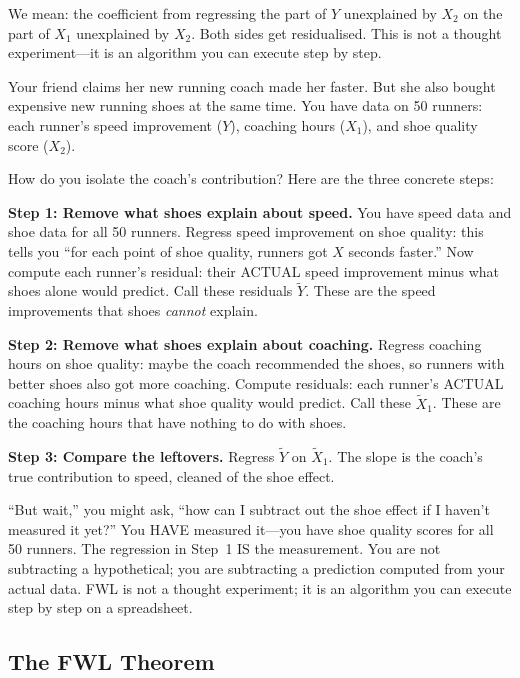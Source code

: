 \documentclass[11pt,a4paper]{article}
\theoremstyle{definition}
\theoremstyle{plain}
\theoremstyle{remark}
\begin{document}
We mean: the coefficient from regressing the part of $Y$ unexplained by $X_2$ on the part of $X_1$ unexplained by $X_2$. Both sides get residualised. This is not a thought experiment---it is an algorithm you can execute step by step.

\begin{toystory}[title={Is It the Coaching or Just the New Shoes?}]
Your friend claims her new running coach made her faster. But she also bought expensive new running shoes at the same time. You have data on 50 runners: each runner's speed improvement ($Y$), coaching hours ($X_1$), and shoe quality score ($X_2$).

How do you isolate the coach's contribution? Here are the three concrete steps:

\textbf{Step 1: Remove what shoes explain about speed.} You have speed data and shoe data for all 50 runners. Regress speed improvement on shoe quality: this tells you ``for each point of shoe quality, runners got $X$ seconds faster.'' Now compute each runner's residual: their ACTUAL speed improvement minus what shoes alone would predict. Call these residuals $\tilde{Y}$. These are the speed improvements that shoes \emph{cannot} explain.

\textbf{Step 2: Remove what shoes explain about coaching.} Regress coaching hours on shoe quality: maybe the coach recommended the shoes, so runners with better shoes also got more coaching. Compute residuals: each runner's ACTUAL coaching hours minus what shoe quality would predict. Call these $\tilde{X}_1$. These are the coaching hours that have nothing to do with shoes.

\textbf{Step 3: Compare the leftovers.} Regress $\tilde{Y}$ on $\tilde{X}_1$. The slope is the coach's true contribution to speed, cleaned of the shoe effect.

``But wait,'' you might ask, ``how can I subtract out the shoe effect if I haven't measured it yet?'' You HAVE measured it---you have shoe quality scores for all 50 runners. The regression in Step~1 IS the measurement. You are not subtracting a hypothetical; you are subtracting a prediction computed from your actual data. FWL is not a thought experiment; it is an algorithm you can execute step by step on a spreadsheet.
\end{toystory}

\subsection{The FWL Theorem}
\end{document}
